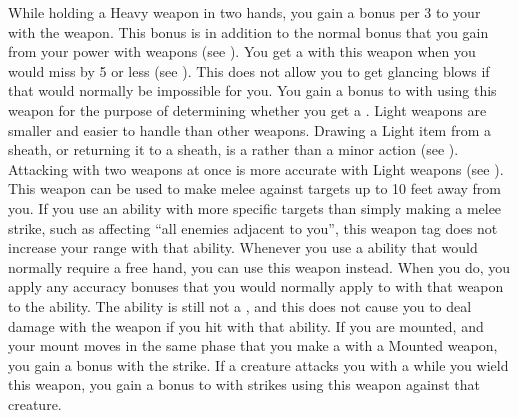    While holding a Heavy weapon in two hands, you gain a  bonus per 3  to your  with the weapon.
    This bonus is in addition to the normal bonus that you gain from your power with weapons (see ).
     You get a  with this weapon when you would miss by 5 or less (see ).
    This does not allow you to get glancing blows if that would normally be impossible for you.
     You gain a  bonus to  with  using this weapon for the purpose of determining whether you get a .
     Light weapons are smaller and easier to handle than other weapons.
    Drawing a Light item from a sheath, or returning it to a sheath, is a  rather than a minor action (see ).
    Attacking with two weapons at once is more accurate with Light weapons (see ).
    \label{Long Weapon} This weapon can be used to make melee  against targets up to 10 feet away from you.
    If you use an ability with more specific targets than simply making a melee strike, such as affecting ``all enemies adjacent to you'', this weapon tag does not increase your range with that ability.
     Whenever you use a \atBrawling ability that would normally require a free hand, you can use this weapon instead.
    When you do, you apply any accuracy bonuses that you would normally apply to  with that weapon to the ability.
    The ability is still not a , and this does not cause you to deal damage with the weapon if you hit with that ability.
    \label{Mounted Weapon} If you are mounted, and your mount moves in the same phase that you make a  with a Mounted weapon, you gain a   bonus with the strike.
     If a creature attacks you with a   while you wield this weapon, you  gain a  bonus to  with strikes using this weapon against that creature.
